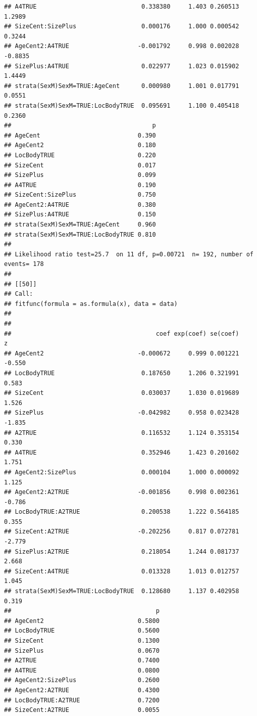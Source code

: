 \documentclass{article}\usepackage[]{graphicx}\usepackage[]{color}
\makeatletter
\newenvironment{kframe}{%
 \def\at@end@of@kframe{}%
 \ifinner\ifhmode%
  \def\at@end@of@kframe{\end{minipage}}%
  \begin{minipage}{\columnwidth}%
 \fi\fi%
 \def\FrameCommand##1{\hskip\@totalleftmargin \hskip-\fboxsep
 \colorbox{shadecolor}{##1}\hskip-\fboxsep
     \hskip-\linewidth \hskip-\@totalleftmargin \hskip\columnwidth}%
 \MakeFramed {\advance\hsize-\width
   \@totalleftmargin\z@ \linewidth\hsize
   \@setminipage}}%
 {\par\unskip\endMakeFramed%
 \at@end@of@kframe}
\newenvironment{knitrout}{}{} %
\makeatother
\begin{document}
\begin{knitrout}
\begin{kframe}
\begin{verbatim}
## A4TRUE                             0.338380     1.403 0.260513  1.2989
## SizeCent:SizePlus                  0.000176     1.000 0.000542  0.3244
## AgeCent2:A4TRUE                   -0.001792     0.998 0.002028 -0.8835
## SizePlus:A4TRUE                    0.022977     1.023 0.015902  1.4449
## strata(SexM)SexM=TRUE:AgeCent      0.000980     1.001 0.017791  0.0551
## strata(SexM)SexM=TRUE:LocBodyTRUE  0.095691     1.100 0.405418  0.2360
##                                       p
## AgeCent                           0.390
## AgeCent2                          0.180
## LocBodyTRUE                       0.220
## SizeCent                          0.017
## SizePlus                          0.099
## A4TRUE                            0.190
## SizeCent:SizePlus                 0.750
## AgeCent2:A4TRUE                   0.380
## SizePlus:A4TRUE                   0.150
## strata(SexM)SexM=TRUE:AgeCent     0.960
## strata(SexM)SexM=TRUE:LocBodyTRUE 0.810
## 
## Likelihood ratio test=25.7  on 11 df, p=0.00721  n= 192, number of events= 178 
## 
## [[50]]
## Call:
## fitfunc(formula = as.formula(x), data = data)
## 
## 
##                                        coef exp(coef) se(coef)      z
## AgeCent2                          -0.000672     0.999 0.001221 -0.550
## LocBodyTRUE                        0.187650     1.206 0.321991  0.583
## SizeCent                           0.030037     1.030 0.019689  1.526
## SizePlus                          -0.042982     0.958 0.023428 -1.835
## A2TRUE                             0.116532     1.124 0.353154  0.330
## A4TRUE                             0.352946     1.423 0.201602  1.751
## AgeCent2:SizePlus                  0.000104     1.000 0.000092  1.125
## AgeCent2:A2TRUE                   -0.001856     0.998 0.002361 -0.786
## LocBodyTRUE:A2TRUE                 0.200538     1.222 0.564185  0.355
## SizeCent:A2TRUE                   -0.202256     0.817 0.072781 -2.779
## SizePlus:A2TRUE                    0.218054     1.244 0.081737  2.668
## SizeCent:A4TRUE                    0.013328     1.013 0.012757  1.045
## strata(SexM)SexM=TRUE:LocBodyTRUE  0.128680     1.137 0.402958  0.319
##                                        p
## AgeCent2                          0.5800
## LocBodyTRUE                       0.5600
## SizeCent                          0.1300
## SizePlus                          0.0670
## A2TRUE                            0.7400
## A4TRUE                            0.0800
## AgeCent2:SizePlus                 0.2600
## AgeCent2:A2TRUE                   0.4300
## LocBodyTRUE:A2TRUE                0.7200
## SizeCent:A2TRUE                   0.0055

\end{verbatim}
\end{kframe}
\end{knitrout}
\end{document}
